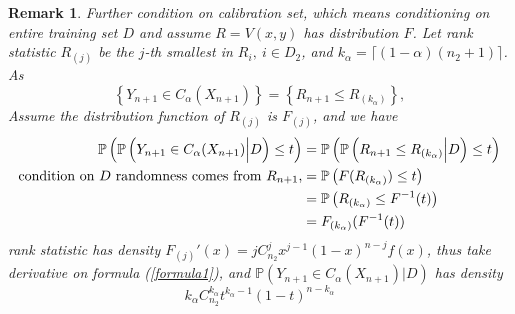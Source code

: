 \documentclass[12pt, a4paper, oneside]{article}
\newtheorem{remark}[theorem]{Remark}
\begin{document}
    \begin{remark}
        Further condition on calibration set, which means conditioning on entire training set $D$ and assume $R=V(x,y)$ has distribution $F$. Let rank statistic $R_{(j)}$ be the $j$-th smallest in $R_i,\ i\in D_2$, and $k_\alpha=\lceil (1-\alpha)(n_2+1)\rceil$. As
        \begin{equation*}
            \left\{ Y_{n+1}\in C_\alpha(X_{n+1}) \right\}=\left\{ R_{n+1}\leq R_{(k_\alpha)} \right\},
        \end{equation*}
        Assume the distribution function of $R_{(j)}$ is $F_{(j)}$, and we have
        \begin{align}
            \mathbb{P}\left( \mathbb{P}\left( Y_{n+1}\in C_\alpha(X_{n+1})\Big|D \right)\leq t \right)&=\mathbb{P}\left( \mathbb{P}\left( R_{n+1}\leq R_{(k_\alpha)}\Big|D \right)\leq t \right)\notag\\
            \text{condition on $D$ randomness comes from $R_{n+1}$,}&=\mathbb{P}\left( F(R_{(k_\alpha)})\leq t \right)\notag\\
            &=\mathbb{P}\left( R_{(k_\alpha)}\leq F^{-1}(t) \right)\notag\\
            &=F_{(k_\alpha)}(F^{-1}(t))\label{formula1}
        \end{align}
        rank statistic has density $F_{(j)}'(x)=jC_{n_2}^jx^{j-1}(1-x)^{n-j}f(x)$, thus take derivative on formula (\ref{formula1}), and $\mathbb{P}\left( Y_{n+1}\in C_\alpha(X_{n+1})\Big|D \right)$ has density
        \begin{equation*}
            k_\alpha C_{n_2}^{k_\alpha}t^{k_\alpha-1}(1-t)^{n-k_\alpha}
        \end{equation*}
    \end{remark}
\end{document}
